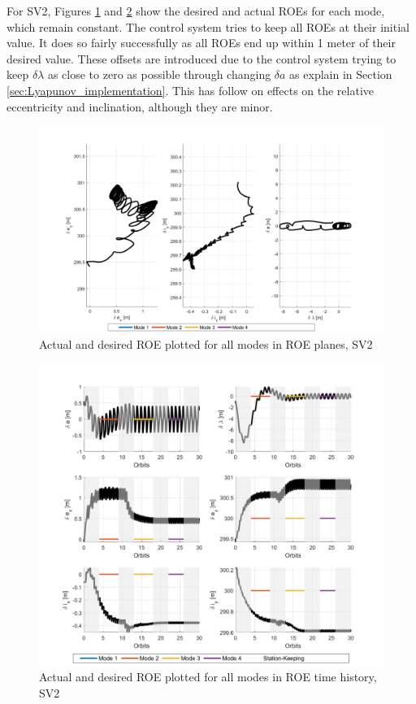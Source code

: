 For SV2, Figures \ref{fig:roe_planes_modes_cont_SV2} and \ref{fig:roe_time_modes_cont_SV2} show the desired and actual ROEs for each mode, which remain constant. The control system tries to keep all ROEs at their initial value. It does so fairly successfully as all ROEs end up within 1 meter of their desired value. These offsets are introduced due to the control system trying to keep $\delta \lambda$ as close to zero as possible through changing $\delta a$ as explain in Section \ref{sec:Lyapunov_implementation}. This has follow on effects on the relative eccentricity and inclination, although they are minor. 

\begin{figure}[H]
    \centering
    \includegraphics[width=0.75\linewidth]{sim/figures/PS6/ROE_planes_modes_SV2.png}
    \caption{Actual and desired ROE plotted for all modes in ROE planes, SV2}
    \label{fig:roe_planes_modes_cont_SV2}
\end{figure}
\begin{figure}[H]
    \centering
    \includegraphics[width=0.75\linewidth]{sim/figures/PS6/ROE_over_time_modes_SV2.png}
    \caption{Actual and desired ROE plotted for all modes in ROE time history, SV2}
    \label{fig:roe_time_modes_cont_SV2}
\end{figure}

